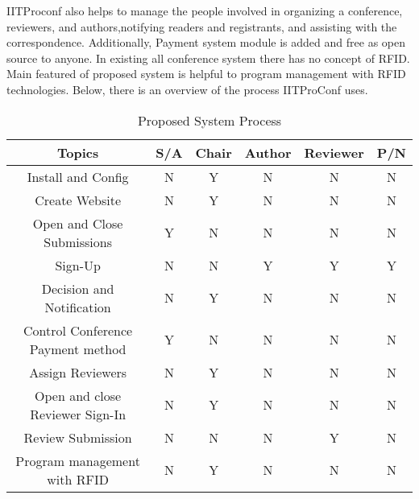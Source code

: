 IITProconf also helps to manage the people involved in organizing a conference, reviewers, and authors,notifying readers and registrants, and assisting with the correspondence. Additionally, Payment system module is added and free as open source to anyone. In existing all conference system there has no concept of RFID. Main featured of proposed system is helpful to program management with RFID technologies.\newline
Below, there is an overview of the process IITProConf uses.
\begin{center}
\begin{table}[htbp]
   \begin{tabular}{|c|c|c|c|c|c|}
     \hline
     Topics & S/A & Chair & Author & Reviewer & P/N \\\hline
     Install and Config & N & Y & N &N &N \\\hline
     Create Website & N & Y & N &N &N \\\hline
     Open and Close Submissions& Y & N & N &N &N \\\hline
     Sign-Up & N & N & Y &Y &Y \\\hline
     Decision  and Notification & N & Y & N &N &N \\\hline
     Control Conference Payment method & Y & N & N &N &N \\\hline
     Assign  Reviewers & N & Y & N & N & N \\\hline
     Open and close Reviewer Sign-In & N & Y & N & N & N \\\hline
     Review Submission & N & N & N & Y & N \\\hline
     Program management with RFID  & N & Y & N & N & N \\\hline
   \end{tabular}
   \caption[Proposed System Process.]{Proposed System Process}
	\label{tab:system process}

  \end{table}
  \end{center}






